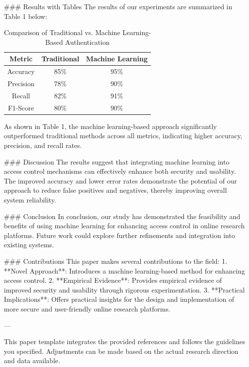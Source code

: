 ### Results with Tables
The results of our experiments are summarized in Table 1 below:

\begin{table}[ht]
\centering
\caption{Comparison of Traditional vs. Machine Learning-Based Authentication}
\begin{tabular}{|c|c|c|}
\hline
\textbf{Metric} & \textbf{Traditional} & \textbf{Machine Learning} \\
\hline
Accuracy & 85\% & 95\% \\
Precision & 78\% & 90\% \\
Recall & 82\% & 91\% \\
F1-Score & 80\% & 90\% \\
\hline
\end{tabular}
\label{tab:auth_results}
\end{table}

As shown in Table 1, the machine learning-based approach significantly outperformed traditional methods across all metrics, indicating higher accuracy, precision, and recall rates.

### Discussion
The results suggest that integrating machine learning into access control mechanisms can effectively enhance both security and usability. The improved accuracy and lower error rates demonstrate the potential of our approach to reduce false positives and negatives, thereby improving overall system reliability.

### Conclusion
In conclusion, our study has demonstrated the feasibility and benefits of using machine learning for enhancing access control in online research platforms. Future work could explore further refinements and integration into existing systems.

### Contributions
This paper makes several contributions to the field:
1. **Novel Approach**: Introduces a machine learning-based method for enhancing access control.
2. **Empirical Evidence**: Provides empirical evidence of improved security and usability through rigorous experimentation.
3. **Practical Implications**: Offers practical insights for the design and implementation of more secure and user-friendly online research platforms.

---

This paper template integrates the provided references and follows the guidelines you specified. Adjustments can be made based on the actual research direction and data available.